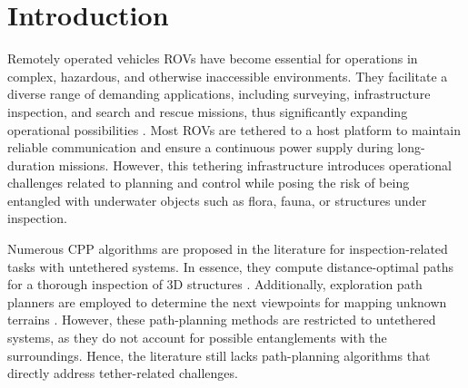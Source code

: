 \section{Introduction}
\label{sec:introduction}

%
%
%

Remotely operated vehicles \Acfp{ROV} have become essential for operations in complex, hazardous, and otherwise inaccessible environments. They facilitate a diverse range of demanding applications, including surveying, infrastructure inspection, and search and rescue missions, thus significantly expanding operational possibilities \cite{amer2023unav, amer2025modelling}. Most \acp{ROV} are tethered to a host platform to maintain reliable communication and ensure a continuous power supply during long-duration missions. However, this tethering infrastructure introduces operational challenges related to planning and control while posing the risk of being entangled with underwater objects such as flora, fauna, or structures under inspection.

%
%


Numerous \ac{CPP} algorithms are proposed in the literature for inspection-related tasks with untethered systems. In essence, they compute distance-optimal paths for a thorough inspection of 3D structures \cite{bircher2015structural,feng2024fc, amer2023visual}.  Additionally, exploration path planners are employed to determine the next viewpoints for mapping unknown terrains \cite{dang2020graph}. However, these path-planning methods are restricted to untethered systems, as they do not account for possible entanglements with the surroundings. Hence, the literature still lacks path-planning algorithms that directly address tether-related challenges.

